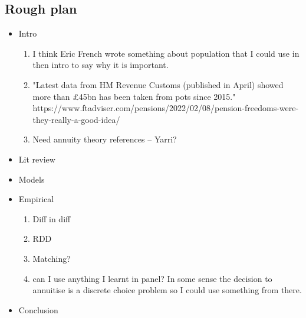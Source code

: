\documentclass[12pt]{article}
\begin{document}
\subsection{Rough plan}
\begin{itemize}
      \item Intro
            \begin{enumerate}
                  \item I think Eric French wrote something about population that I could use in then intro to say why it is important.
                  \item "Latest data from HM Revenue Customs (published in April) showed more than £45bn has been taken from pots since 2015."
                        https://www.ftadviser.com/pensions/2022/02/08/pension-freedoms-were-they-really-a-good-idea/

                  \item Need annuity theory references -- Yarri?
            \end{enumerate}
      \item Lit review
      \item Models
      \item Empirical
            \begin{enumerate}
                  \item Diff in diff
                  \item RDD
                  \item Matching?
                  \item can I use anything I learnt in panel?
                        In some sense the decision to annuitise is a discrete choice problem so I could use something from there.
            \end{enumerate}
      \item Conclusion
\end{itemize}




\end{document}
